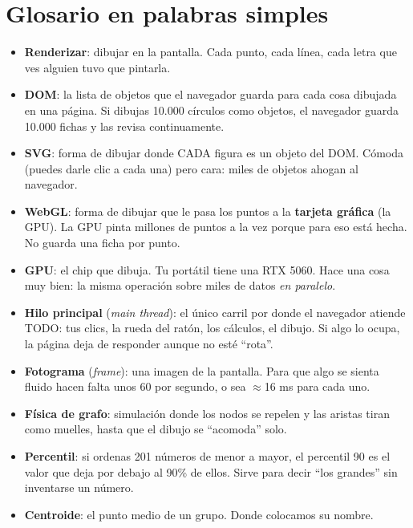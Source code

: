 \documentclass[11pt,a4paper]{article}
\begin{document}

\section{Glosario en palabras simples}

\begin{itemize}
  \item \textbf{Renderizar}: dibujar en la pantalla. Cada punto, cada línea, cada letra
        que ves alguien tuvo que pintarla.
  \item \textbf{DOM}: la lista de objetos que el navegador guarda para cada cosa
        dibujada en una página. Si dibujas 10.000 círculos como objetos, el navegador
        guarda 10.000 fichas y las revisa continuamente.
  \item \textbf{SVG}: forma de dibujar donde CADA figura es un objeto del DOM. Cómoda
        (puedes darle clic a cada una) pero cara: miles de objetos ahogan al navegador.
  \item \textbf{WebGL}: forma de dibujar que le pasa los puntos a la \textbf{tarjeta
        gráfica} (la GPU). La GPU pinta millones de puntos a la vez porque para eso está
        hecha. No guarda una ficha por punto.
  \item \textbf{GPU}: el chip que dibuja. Tu portátil tiene una RTX 5060. Hace una cosa
        muy bien: la misma operación sobre miles de datos \emph{en paralelo}.
  \item \textbf{Hilo principal} (\emph{main thread}): el único carril por donde el
        navegador atiende TODO: tus clics, la rueda del ratón, los cálculos, el dibujo.
        Si algo lo ocupa, la página deja de responder aunque no esté ``rota''.
  \item \textbf{Fotograma} (\emph{frame}): una imagen de la pantalla. Para que algo se
        sienta fluido hacen falta unos 60 por segundo, o sea $\approx$16 ms para cada uno.
  \item \textbf{Física de grafo}: simulación donde los nodos se repelen y las aristas
        tiran como muelles, hasta que el dibujo se ``acomoda'' solo.
  \item \textbf{Percentil}: si ordenas 201 números de menor a mayor, el percentil 90 es
        el valor que deja por debajo al 90\% de ellos. Sirve para decir ``los grandes''
        sin inventarse un número.
  \item \textbf{Centroide}: el punto medio de un grupo. Donde colocamos su nombre.
\end{itemize}
\end{document}
